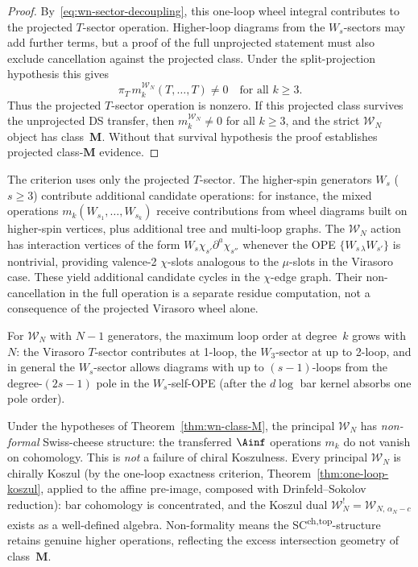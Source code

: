 \begin{proof}
By~\eqref{eq:wn-sector-decoupling}, this one-loop wheel integral
contributes to the projected $T$-sector operation. Higher-loop
diagrams from the $W_s$-sectors may add further terms, but a proof of
the full unprojected statement must also exclude cancellation against
the projected class. Under the split-projection hypothesis this gives
\[
\pi_T\,m_k^{\mathcal{W}_N}(T, \ldots, T) \ne 0
\quad\text{for all } k \ge 3.
\]
Thus the projected $T$-sector operation is nonzero. If this projected
class survives the unprojected DS transfer, then
$m_k^{\mathcal W_N}\ne0$ for all $k\ge3$, and the strict
$\mathcal W_N$ object has class~$\mathbf M$. Without that survival
hypothesis the proof establishes projected class-$\mathbf M$ evidence.
\end{proof}

\begin{remark}
\label{rem:wn-additional-diagrams}
%
The criterion uses only the projected $T$-sector. The higher-spin
generators $W_s$ ($s \ge 3$) contribute additional
candidate operations: for instance, the mixed operations
$m_k(W_{s_1}, \ldots, W_{s_k})$ receive contributions
from wheel diagrams built on higher-spin vertices, plus
additional tree and multi-loop graphs. The $\mathcal{W}_N$
action has interaction vertices of the form
$W_s \chi_{s'} \partial^{a} \chi_{s''}$ whenever the OPE
$\{W_{s\,\lambda} W_{s'}\}$ is nontrivial, providing
valence-2 $\chi$-slots analogous to the $\mu$-slots
in the Virasoro case. These yield additional candidate cycles in the
$\chi$-edge graph. Their non-cancellation in the full
operation is a separate residue computation, not a consequence of the
projected Virasoro wheel alone.

For $\mathcal{W}_N$ with $N-1$ generators, the maximum
loop order at degree~$k$ grows with $N$: the Virasoro
$T$-sector contributes at 1-loop, the $W_3$-sector at up to
2-loop, and in general the $W_s$-sector allows diagrams
with up to $(s-1)$-loops from the degree-$(2s-1)$ pole in the
$W_s$-self-OPE (after the $d\log$ bar kernel absorbs one pole order).
\end{remark}

\begin{remark}
\label{rem:wn-koszul-nonformality}
%
Under the hypotheses of Theorem~\ref{thm:wn-class-M}, the principal
$\mathcal{W}_N$ has \emph{non-formal} Swiss-cheese structure:
the transferred $\Ainf$ operations $m_k$ do not vanish on
cohomology. This is \emph{not} a failure of chiral Koszulness.
Every principal $\mathcal{W}_N$ is chirally Koszul
\textup{(}by the one-loop exactness criterion,
Theorem~\textup{\ref{thm:one-loop-koszul}},
applied to the affine pre-image, composed with
Drinfeld--Sokolov reduction\textup{)}: bar cohomology is
concentrated, and the Koszul dual
$\mathcal{W}_N^! = \mathcal{W}_{N,\,\alpha_N - c}$
exists as a well-defined algebra. Non-formality means
the SC\textsuperscript{ch,top}-structure
retains genuine higher operations, reflecting the excess
intersection geometry of class~$\mathbf{M}$.
\end{remark}

